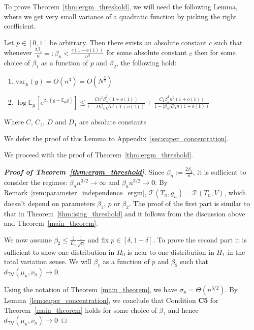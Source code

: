 \documentclass[final,12pt]{colt2018}
\begin{document}
To prove Theorem~\ref{thm:ergm_threshold}, we will need the following Lemma, where we get very small variance of a quadratic function by picking the right coefficient.
\begin{lemma}
\label{lem:super_concentration}
Let $p \in [0,1]$ be arbitrary. Then there exists an absolute constant $c$ such that whenever $\frac{2\beta_2}{n} =: \beta_n < \frac{c(1-o(1))}{n^3}$ for some absolute constant $c$ then for some choice of $\beta_1$ as a function of $p$ and $\beta_2$,
the following hold:
\begin{enumerate}
\item $\mathrm{var}_\mu(g) = O(n^3)= O(N^{\frac{3}{2}})$
\item
$\log{\mathbb{E}_{\mu} \left[e^{\beta_n(g - \mathbb{E}_{\mu}g)}\right]} \leq  \frac{Cn^3\beta_n^2(1+o(1))}{ 1 - D\beta_n\sqrt{n^3(1+o(1))}} +  \frac{C_1 \beta_n^2 n^2(1+o(1))}{1-|\beta_n|D_1n(1+o(1))}$
\end{enumerate}
Where $C$, $C_1$, $D$ and $D_1$ are absolute constants
\end{lemma}
We defer the proof of this Lemma to Appendix~\ref{sec:super_concentration}. 



We proceed with the proof of Theorem~\ref{thm:ergm_threshold}.



\begin{proof}[\textbf{Proof of Theorem~\ref{thm:ergm_threshold}}]
Since $\beta_n := \frac{2\beta_2}{n}$, it is sufficient to consider the regimes:
$\beta_n n^{3/2} \to \infty$ and $\beta_n n^{3/2} \to 0$. By Remark~\ref{rem:parameter_independence_ergm}, $\mathcal{T}(T_n,g_n) = \mathcal{T}(T_n,V)$, which doesn't depend on parameters $\beta_1$, $p$ or $\beta_2$. The proof of the first part is similar to that in Theorem~\ref{thm:ising_threshold} and it follows from the discussion above and Theorem~\ref{main_theorem}.

We now assume $\beta_2 \leq \frac{1}{L_n}\frac{1}{\sqrt{n}}$ and fix $p \in [\delta,1-\delta]$.  To prove the second part it is sufficient to show one distribution in $H_0$ is near to one distribution in $H_1$ in the total variation sense. We will $\beta_1$ as a function of $p$ and $\beta_2$ such that $d_{\mathsf{TV}}(\mu_n,\nu_n) \to 0$.

 Using the notation of Theorem~\ref{main_theorem}, we have $\sigma_n = \Theta(n^{3/2})$.
 By Lemma~\ref{lem:super_concentration}, we conclude that Condition \textbf{C5} for Theorem~\ref{main_theorem} holds for some choice of $\beta_1$ and hence $d_{\mathsf{TV}}(\mu_n,\nu_n) \to 0$
\end{proof}
\end{document}
